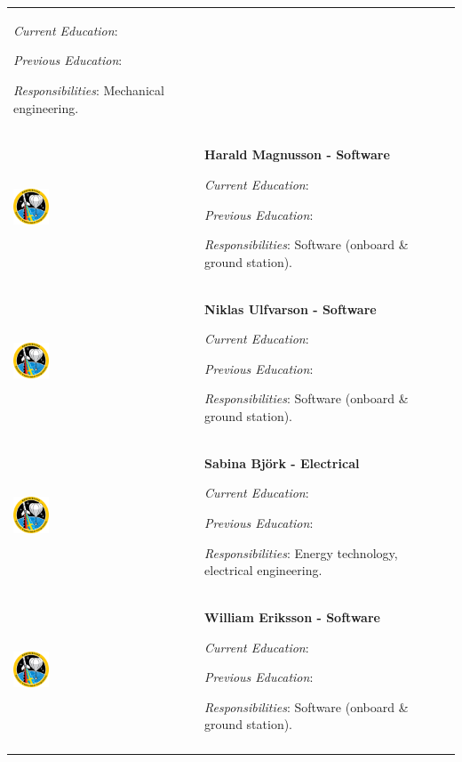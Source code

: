 \begin{longtable}[]{m{} m{}}
\smallskip
\textit{Current Education}: 

\smallskip
\textit{Previous Education}:

\smallskip
\textit{Responsibilities}: Mechanical engineering.
\bigskip
\\
 \includegraphics[width=0.2\textwidth]{0-cover/img/logo-rexus-bexus.png}  & \textbf{Harald Magnusson - Software}

\smallskip
\textit{Current Education}: 

\smallskip
\textit{Previous Education}:

\smallskip
\textit{Responsibilities}: Software (onboard \& ground station).
\bigskip
\\
 \includegraphics[width=0.2\textwidth]{0-cover/img/logo-rexus-bexus.png}  & \textbf{Niklas Ulfvarson - Software}

\smallskip
\textit{Current Education}: 

\smallskip
\textit{Previous Education}:

\smallskip
\textit{Responsibilities}: Software (onboard \& ground station).
\bigskip
\\
 \includegraphics[width=0.2\textwidth]{0-cover/img/logo-rexus-bexus.png}  & \textbf{Sabina Bj\"ork - Electrical}

\smallskip
\textit{Current Education}: 

\smallskip
\textit{Previous Education}:

\smallskip
\textit{Responsibilities}: Energy technology, electrical engineering.
\bigskip
\\
 \includegraphics[width=0.2\textwidth]{0-cover/img/logo-rexus-bexus.png}  & \textbf{William Eriksson - Software}

\smallskip
\textit{Current Education}: 

\smallskip
\textit{Previous Education}:

\smallskip
\textit{Responsibilities}: Software (onboard \& ground station).
\bigskip
\\
\label{tab:people}
\end{longtable}
\raggedbottom